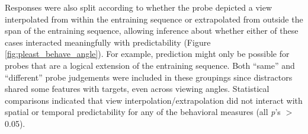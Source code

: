 \documentclass[dwyatte_dissertation.tex]{subfiles}
\begin{document}
Responses were also split according to whether the probe depicted a view interpolated from within the entraining sequence or extrapolated from outside the span of the entraining sequence, allowing inference about whether either of these cases interacted meaningfully with predictability (Figure \ref{fig:pleast_behave_angle}). For example, prediction might   only be possible for probes that are a logical extension of the entraining sequence. Both ``same'' and ``different'' probe judgements were included in these groupings since distractors shared some features with targets, even across viewing angles. Statistical comparisons indicated that view interpolation/extrapolation did not interact with spatial or temporal predictability for any of the behavioral measures (all \textit{p}'s $>$ 0.05).

\end{document}
